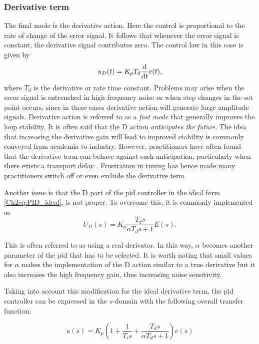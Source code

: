 \subsubsection*{Derivative term}
%
The final mode is the derivative  action. Here the control is proportional to the rate of change of the error signal. It follows that whenever the error signal is constant, the derivative signal contributes zero. The control law in this case is given by
\begin{equation*}
u_D(t) = K_pT_d \frac{\mathrm{d}}{\mathrm{d} t}e(t),
\end{equation*}
%
where $T_d$ is the derivative or rate time constant. Problems may arise when the error signal is entrenched in high-frequency noise or when step changes in the set point occurs, since in these cases derivative action will generate large amplitude signals. Derivative action is referred to as a \emph{fast mode} that generally improves the loop stability. It is often said that the D action \emph{anticipates the future}. The idea that increasing the derivative gain will lead to improved stability is commonly conveyed from academia to industry. However, practitioners have often found that the derivative term can behave against such anticipation, particularly when there exists a transport delay \citep{VilanovaBook2012}. Frustration in tuning  has hence made many practitioners switch off or even exclude the derivative term.  

Another issue is that the D part of the \gls{pid} controller in the ideal form \eqref{Ch2eq:PID_ideal}, is not proper. To overcome this, it is commonly implemented as
\begin{equation*}
	U_D(s)= K_p\frac{T_ds}{\alpha T_d s+1} E(s).
\end{equation*}

This is often referred to as using a real derivator. In this way, $\alpha$ becomes another parameter of the \gls{pid} that has to be selected. It is worth noting that small values for $\alpha$ makes the implementation of the D action similar to a true derivative but it also increases the high frequency gain, thus increasing noise sensitivity.

Taking into account this modification for the ideal derivative term, the \gls{pid} controller can be expressed in the $s$-domain with the following overall transfer function:

\begin{equation}
u(s)=K_p \left ( 1+\frac{1}{T_is}+\frac{T_ds}{\alpha T_d s+1} \right )  e(s)
\end{equation}

